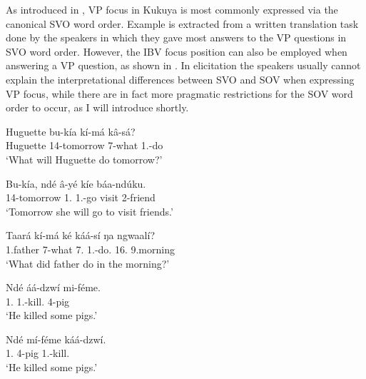 \documentclass[output=paper,colorlinks,citecolor=brown,
]{langscibook}
\begin{document}
As introduced in , VP focus in Kukuya is most commonly expressed via the canonical SVO word order. Example  is extracted from a written translation task done by the speakers in which they gave most answers to the VP questions in SVO word order. However, the IBV focus position can also be employed when answering a VP question, as shown in . In elicitation the speakers usually cannot explain the interpretational differences between SVO and SOV when expressing VP focus, while there are in fact more pragmatic restrictions for the SOV word order to occur, as I will introduce shortly.
  \begin{exe}
    \ex \label{45}
    \begin{xlist}
\ex
\label{45a}
\gll
Huguette bu-k\'{i}a k\'{i}-m\'{a} k\^{a}-s\'{a}?\\
Huguette 14-tomorrow 7-what 1\Sm{}.\Fut{}-do\\
\trans ‘What will Huguette do tomorrow?’

\ex
\label{45b}
\gll
Bu-k\'{i}a, ndé \^{a}-y\'{e} k\'{i}e báa-nd\'{u}ku.\\
14-tomorrow 1.\Pro{} 1\Sm{}.\Fut{}-go visit 2-friend \\
\trans ‘Tomorrow she will go to visit friends.’

    \end{xlist}
\end{exe}
 \begin{exe}
    \ex \label{46}
    \begin{xlist}
\ex
\label{46a}
\gll
Taará kí-má ké káá-sí ŋa ngwaal\'{i}?\\
1.father 7-what 7.\Pro{} 1\Sm{}.\Pst{}-do.\Pst{} 16.\Loc{} 9.morning\\
\trans ‘What did father do in the morning?’

\ex
\label{46b}
\gll
Ndé áá-dzw\'{i} mi-f\'{e}me.\\
1.\Pro{} 1\Sm{}.\Pst{}-kill.\Pst{} 4-pig\\
\trans ‘He killed some pigs.’

\ex
\label{46c}
\gll
Ndé m\'{i}-f\'{e}me káá-dzw\'{i}.\\
1.\Pro{} 4-pig 1\Sm{}.\Pst{}-kill.\Pst{}\\
\trans ‘He killed some pigs.’

    \end{xlist}
\end{exe}
\end{document}
